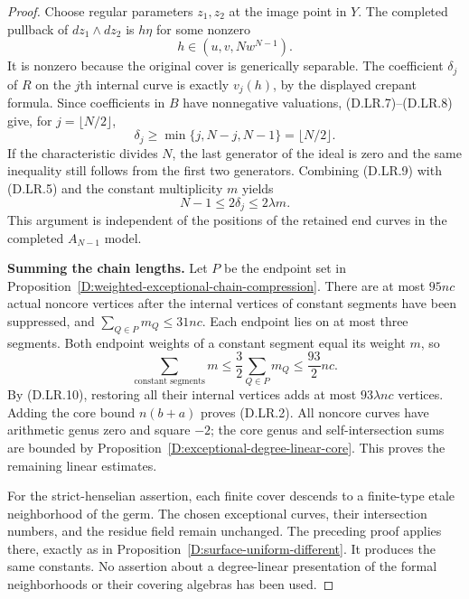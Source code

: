 \begin{proof}
Choose regular parameters $z_1,z_2$ at the image point in $Y$.
The completed pullback of $dz_1\wedge dz_2$ is $h\eta$ for
some nonzero
\[
                         h\in(u,v,Nw^{N-1}).
\]
It is nonzero because the original cover is generically separable.
The coefficient $\delta_j$ of $R$ on the $j$th internal curve
is exactly $v_j(h)$, by the displayed crepant formula.  Since
coefficients in $B$ have nonnegative valuations, (D.LR.7)--(D.LR.8)
give, for $j=\lfloor N/2\rfloor$,
\[
 \delta_j\ge\min\{j,N-j,N-1\}=\lfloor N/2\rfloor.
 \tag{D.LR.9}
\]
If the characteristic divides $N$, the last generator of the
ideal is zero and the same inequality still follows from the
first two generators.  Combining (D.LR.9) with (D.LR.5) and
the constant multiplicity $m$ yields
\[
                         N-1\le2\delta_j\le2\lambda m.
                         \tag{D.LR.10}
\]
This argument is independent of the positions of the retained
end curves in the completed $A_{N-1}$ model.

\par\smallskip\noindent\textbf{Summing the chain lengths.}\quad
Let $P$ be the endpoint set in
Proposition~\ref{D:weighted-exceptional-chain-compression}.
There are at most $95nc$ actual noncore vertices after the
internal vertices of constant segments have been suppressed,
and $\sum_{Q\in P}m_Q\le31nc$.
Each endpoint lies on at most three segments.  Both endpoint
weights of a constant segment equal its weight $m$, so
\[
               \sum_{\text{constant segments}}m
                    \le\frac32\sum_{Q\in P}m_Q
                    \le\frac{93}{2}nc.
\]
By (D.LR.10), restoring all their internal vertices adds at
most $93\lambda nc$ vertices.  Adding the core bound
$n(b+a)$ proves (D.LR.2).
All noncore curves have arithmetic genus zero and square $-2$;
the core genus and self-intersection sums are bounded by
Proposition~\ref{D:exceptional-degree-linear-core}.  This proves
the remaining linear estimates.

For the strict-henselian assertion, each finite cover descends
to a finite-type etale neighborhood of the germ.  The chosen
exceptional curves, their intersection numbers, and the
residue field remain unchanged.  The preceding proof applies
there, exactly as in Proposition~\ref{D:surface-uniform-different}.
It produces the same constants.  No assertion about a
degree-linear presentation of the formal neighborhoods or
their covering algebras has been used.
\end{proof}
